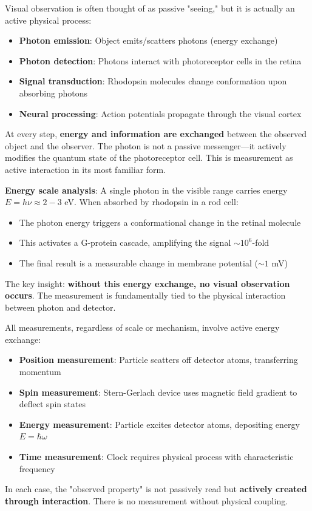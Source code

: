\begin{example}
Visual observation is often thought of as passive "seeing," but it is actually an active physical process:
\begin{itemize}
    \item \textbf{Photon emission}: Object emits/scatters photons (energy exchange)
    \item \textbf{Photon detection}: Photons interact with photoreceptor cells in the retina
    \item \textbf{Signal transduction}: Rhodopsin molecules change conformation upon absorbing photons
    \item \textbf{Neural processing}: Action potentials propagate through the visual cortex
\end{itemize}
At every step, \textbf{energy and information are exchanged} between the observed object and the observer. The photon is not a passive messenger—it actively modifies the quantum state of the photoreceptor cell. This is measurement as active interaction in its most familiar form.

\textbf{Energy scale analysis}: A single photon in the visible range carries energy $E = h\nu \approx 2-3$ eV. When absorbed by rhodopsin in a rod cell:
\begin{itemize}
    \item The photon energy triggers a conformational change in the retinal molecule
    \item This activates a G-protein cascade, amplifying the signal $\sim 10^6$-fold
    \item The final result is a measurable change in membrane potential ($\sim 1$ mV)
\end{itemize}
The key insight: \textbf{without this energy exchange, no visual observation occurs}. The measurement is fundamentally tied to the physical interaction between photon and detector.
\end{example}

\begin{example}
All measurements, regardless of scale or mechanism, involve active energy exchange:
\begin{itemize}
    \item \textbf{Position measurement}: Particle scatters off detector atoms, transferring momentum
    \item \textbf{Spin measurement}: Stern-Gerlach device uses magnetic field gradient to deflect spin states
    \item \textbf{Energy measurement}: Particle excites detector atoms, depositing energy $E = \hbar\omega$
    \item \textbf{Time measurement}: Clock requires physical process with characteristic frequency
\end{itemize}
In each case, the "observed property" is not passively read but \textbf{actively created through interaction}. There is no measurement without physical coupling.
\end{example}


